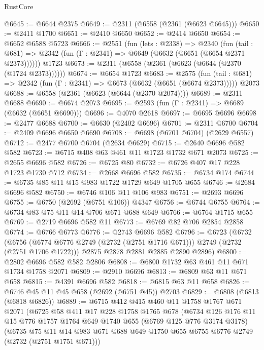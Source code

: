 \begin{lexlean}{RustCore}
\begin{coremodule}
@6645 := @6644 @2375
@6649 := @2311 (@6558 (@2361 (@6623 @6645)))
@6650 := @2411 @1700
@6651 := @2410 @6650
@6652 := @2414 @6650
@6654 := @6652 @6588 @5723
@6666 := @2551
    (fun (lets : @2338) =>
    @2340
      (fun (tail : @681) => @2342 (fun (Γ : @2341) => @6649 (@6632 (@6651 (@6654 @2371 @2373))))))
    @1723
@6673 := @2311 (@6558 (@2361 (@6623 (@6644 (@2370 (@1724 @2373))))))
@6674 := @6654 @1723
@6683 := @2575
    (fun (tail : @681) => @2342 (fun (Γ : @2341) => @6673 (@6632 (@6651 (@6674 @2373)))))
    @2073
@6688 := @6558 (@2361 (@6623 (@6644 (@2370 @2074))))
@6689 := @2311 @6688
@6690 := @6674 @2073
@6695 := @2593 (fun (Γ : @2341) => @6689 (@6632 (@6651 @6690)))
@6696 := @4070 @2618
@6697 := @6695 @6696
@6698 := @2477 @6688
@6700 := @6630 (@2402 @6696)
@6701 := @2311 @6700
@6704 := @2409 @6696 @6650 @6690
@6708 := @6698 (@6701 @6704) (@2629 @6557)
@6712 := @2477 @6700 @6704 (@2634 @6629)
@6715 := @2640 @6696 @582 @582
@6723 := @6715 @408 @63 @461 @11 @1723 @1732 @671 @2073
@6725 := @2655 @6696 @582
@6726 := @6725 @80
@6732 := @6726 @407 @17 @228 @1723 @1730 @712
@6734 := @2668 @6696 @582
@6735 := @6734 @174
@6744 := @6735 @85 @11 @15 @983 @1722 @1729 @649 @1705 @655
@6746 := @2684 @6696 @582
@6750 := @6746 @106 @11 @106 @983
@6751 := @2693 @6696
@6755 := @6750 (@2692 (@6751 @106)) @4347
@6756 := @6744 @6755
@6764 := @6734 @83 @75 @11 @14 @706 @671 @688 @649
@6766 := @6764 @1715 @655
@6769 := @2719 @6696 @582 @11
@6773 := @6769 @82 @706 @2854 @2858
@6774 := @6766 @6773
@6776 := @2743 @6696 @582
@6796 := @6723
    (@6732
      (@6756 (@6774 @6776 @2749 (@2732 (@2751 @1716 @671))) @2749 (@2732 (@2751 @1706 @1722)))
      @2875
      @2878
      @2881
      @2885
      @2890
      @2896)
@6800 := @2802 @6696 @582 @582 @2806
@6808 := @6800 @1732 @63 @461 @11 @671 @1734 @1758 @2071
@6809 := @2910 @6696
@6813 := @6809 @63 @11 @671 @658
@6815 := @4391 @6696 @582
@6818 := @6815 @63 @11 @658
@6826 := @6746 @45 @11 @45 @658 (@2692 (@6751 @45)) @2703
@6829 := @6808 (@6813 (@6818 @6826))
@6889 := @6715
    @412
    @415
    @460
    @11
    @1758
    @1767
    @671
    @2071
    (@6725
      @58
      @411
      @17
      @228
      @1758
      @1765
      @678
      (@6734
        @126
        @176
        @11
        @15
        @776
        @1757
        @1764
        @649
        @1740
        @655
        (@6769 @125 @776 @3174 @3178)
        (@6735
          @75
          @11
          @14
          @983
          @671
          @688
          @649
          @1750
          @655
          @6755
          @6776
          @2749
          (@2732 (@2751 @1751 @671)))

\end{coremodule}
\end{lexlean}
